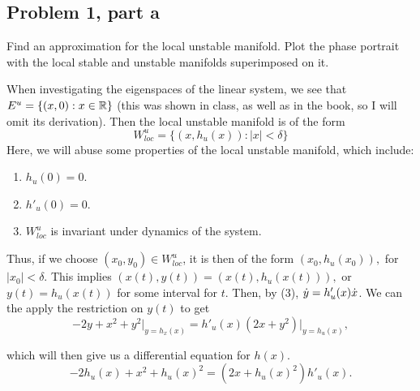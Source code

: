 \subsection{Problem 1, part a}
Find an approximation for the local unstable manifold. Plot the phase portrait with the local stable and unstable manifolds superimposed on it. 
\partbreak
\begin{solution}

    When investigating the eigenspaces of the linear system, we see that $E^u = \{(x, 0):x \in \mathbb{R}\}$ (this was shown in class, as well as in the book, so I will omit its derivation). Then the local unstable manifold is of the form
    \[
    W^u_{loc} = \{(x, h_u(x)) : |x| < \delta\}
    \]
    Here, we will abuse some properties of the local unstable manifold, which include:
    \begin{enumerate}
        \item $h_u(0) = 0.$
        \item $h'_u(0) = 0.$
        \item $W_{loc}^u$ is invariant under dynamics of the system.
    \end{enumerate}

    Thus, if we choose $(x_0, y_0) \in W^u_{loc}$, it is then of the form $(x_0, h_u(x_0)), $ for $|x_0| < \delta$. This implies $(x(t), y(t)) = (x(t), h_u(x(t))),$ or $y(t) = h_u(x(t))$ for some interval for $t$. Then, by (3), $\dot{y} = h'_u(x)\dot{x}$. We can the apply the restriction on $y(t)$ to get
    \[
    -2y + x^2 + y^2 \Bigg|_{y = h_x(x)} = h'_u(x)(2x + y^2)\Bigg|_{y = h_u(x)},
    \]

    which will then give us a differential equation for $h(x)$.
    \[
    -2h_u(x) + x^2 + h_u(x)^2 = (2x + h_u(x)^2)h'_u(x).
    \]


\end{solution}
